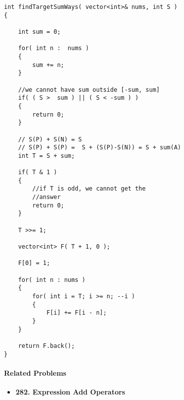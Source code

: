 \setcounter{lstlisting}{0}
\begin{lstlisting}[style=customc, caption={0-1 Kapsnack}]
int findTargetSumWays( vector<int>& nums, int S )
{

    int sum = 0;

    for( int n :  nums )
    {
        sum += n;
    }

    //we cannot have sum outside [-sum, sum]
    if( ( S >  sum ) || ( S < -sum ) )
    {
        return 0;
    }

    // S(P) + S(N) = S
    // S(P) + S(P) =  S + (S(P)-S(N)) = S + sum(A)
    int T = S + sum;

    if( T & 1 )
    {
        //if T is odd, we cannot get the
        //answer
        return 0;
    }

    T >>= 1;

    vector<int> F( T + 1, 0 );

    F[0] = 1;

    for( int n : nums )
    {
        for( int i = T; i >= n; --i )
        {
            F[i] += F[i - n];
        }
    }

    return F.back();
}

\end{lstlisting}

\paragraph{Related Problems}
\begin{itemize}
\item \textbf{282. Expression Add Operators}
\end{itemize}